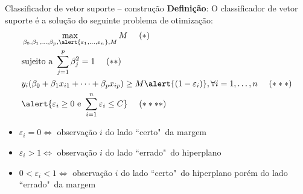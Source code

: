 

\begin{frame}{Classificador de vetor suporte -- construção}
    \textbf{Definição}: O classificador de vetor suporte é a solução do seguinte problema de otimização:
    \begin{align*}
        &\max_{\beta_0, \beta_1, \dots, \beta_p, \alert{\varepsilon_1, \dots, \varepsilon_n}, M} M  ~~~~ (*) \\ 
        &\text{sujeito a } \sum_{j = 1}^{p} \beta_j^2 = 1 ~~~~ (**)\\
        &y_i(\beta_0 + \beta_1 x_{i1} + \dots + \beta_p x_{ip}) \geq M\alert{(1 - \varepsilon_i)}, \forall i = 1, \dots, n ~~~~ (***) \\
        &\alert{\varepsilon_i \geq 0 \text{ e } \sum_{i = 1}^{n} \varepsilon_i \leq C} ~~~~ (****)
    \end{align*}
    
    \pause
    
    \begin{itemize}
        \item $\varepsilon_i = 0 \iff$ observação $i$ do lado ``certo"~da margem
        
        \item $\varepsilon_i > 1 \iff$ observação $i$ do lado ``errado"~do hiperplano
        
        \item $0 < \varepsilon_i < 1 \iff$ observação $i$ do lado ``certo"~do hiperplano porém do lado ``errado"~da margem
    \end{itemize}
\end{frame}



